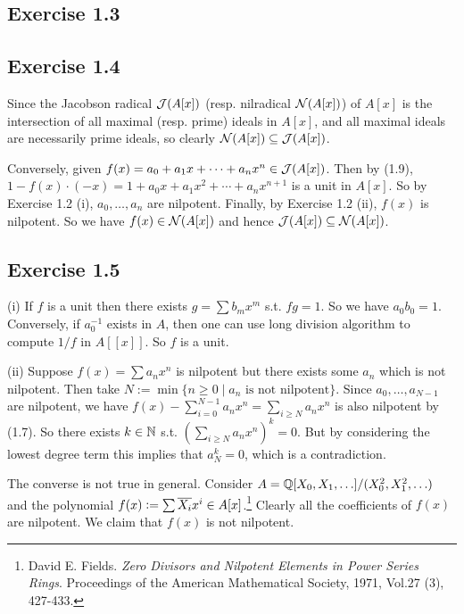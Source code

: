 \documentclass[../A&M.tex]{subfiles}
\begin{document}
\subsection*{Exercise 1.3}

\subsection*{Exercise 1.4}

Since the Jacobson radical $\mathcal{J}(A[x])$ (resp. nilradical $\mathcal{N}(A[x])$) of $A[x]$ is the intersection of all maximal (resp. prime) ideals in $A[x]$, and all maximal ideals are necessarily prime ideals, so clearly $\mathcal{N}(A[x]) \subseteq \mathcal{J}(A[x])$.

Conversely, given $f(x) = a_0+a_1x+\cdots+a_nx^n \in \mathcal{J}(A[x])$. Then by (1.9), $1-f(x) \cdot (-x) = 1+a_0x+a_1x^2+\cdots+a_nx^{n+1}$ is a unit in $A[x]$. So by Exercise 1.2 (i), $a_0,\ldots,a_n$ are nilpotent. Finally, by Exercise 1.2 (ii), $f(x)$ is nilpotent. So we have $f(x)\in \mathcal{N}(A[x])$ and hence $\mathcal{J}(A[x]) \subseteq \mathcal{N}(A[x])$.

\subsection*{Exercise 1.5}

(i) If $f$ is a unit then there exists $g=\sum b_mx^m$ s.t. $fg=1$. So we have $a_0b_0=1$. Conversely, if $a_0^{-1}$ exists in $A$, then one can use long division algorithm to compute $1/f$ in $A[[x]]$. So $f$ is a unit.

(ii) Suppose $f(x)=\sum a_nx^n$ is nilpotent but there exists some $a_n$ which is not nilpotent. Then take $N := \min\{ n\geq0 \mid a_n \text{ is not nilpotent}\}$. Since $a_0,\ldots,a_{N-1}$ are nilpotent, we have $f(x)-\sum_{i=0}^{N-1} a_nx^n = \sum_{i\geq N} a_nx^n$ is also nilpotent by (1.7). So there exists $k\in\mathbb{N}$ s.t. $(\sum_{i\geq N} a_nx^n)^k=0$. But by considering the lowest degree term this implies that $a_N^k=0$, which is a contradiction.

The converse is not true in general. Consider $A=\mathbb{Q}[X_0,X_1,\ldots]/(X_0^2,X_1^2,\ldots)$ and the polynomial $f(x):=\sum \overline{X_i}x^i \in A[x]$.\footnote{David E. Fields. \textit{Zero Divisors and Nilpotent Elements in Power Series Rings}. Proceedings of the American Mathematical Society, 1971, Vol.27 (3), 427-433.} Clearly all the coefficients of $f(x)$ are nilpotent. We claim that $f(x)$ is not nilpotent.
\end{document}
